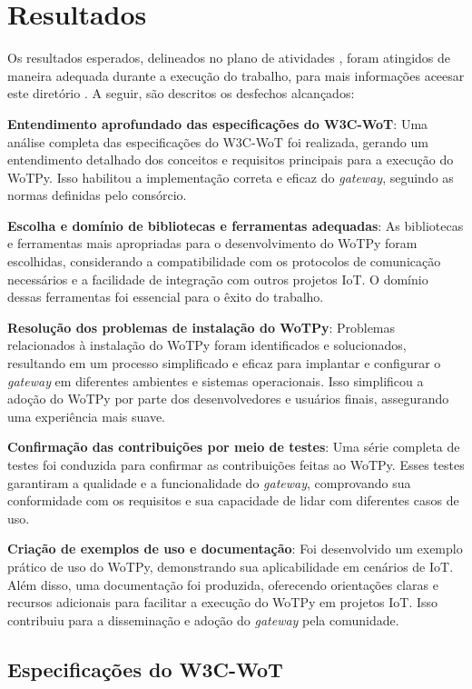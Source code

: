 \chapter{Resultados}

Os resultados esperados, delineados no plano de atividades , foram atingidos de maneira adequada durante a execução do trabalho, para mais informações aceesar este diretório \cite{gitwotpy:readme}. A seguir, são descritos os desfechos alcançados:

\textbf{Entendimento aprofundado das especificações do W3C-WoT}: Uma análise completa das especificações do W3C-WoT foi realizada, gerando um entendimento detalhado dos conceitos e requisitos principais para a execução do WoTPy. Isso habilitou a implementação correta e eficaz do \textit{gateway}, seguindo as normas definidas pelo consórcio.

\textbf{Escolha e domínio de bibliotecas e ferramentas adequadas}: As bibliotecas e ferramentas mais apropriadas para o desenvolvimento do WoTPy foram escolhidas, considerando a compatibilidade com os protocolos de comunicação necessários e a facilidade de integração com outros projetos IoT. O domínio dessas ferramentas foi essencial para o êxito do trabalho.

\textbf{Resolução dos problemas de instalação do WoTPy}: Problemas relacionados à instalação do WoTPy foram identificados e solucionados, resultando em um processo simplificado e eficaz para implantar e configurar o \textit{gateway} em diferentes ambientes e sistemas operacionais. Isso simplificou a adoção do WoTPy por parte dos desenvolvedores e usuários finais, assegurando uma experiência mais suave.

\textbf{Confirmação das contribuições por meio de testes}: Uma série completa de testes foi conduzida para confirmar as contribuições feitas ao WoTPy. Esses testes garantiram a qualidade e a funcionalidade do \textit{gateway}, comprovando sua conformidade com os requisitos e sua capacidade de lidar com diferentes casos de uso.

\textbf{Criação de exemplos de uso e documentação}: Foi desenvolvido um exemplo prático de uso do WoTPy, demonstrando sua aplicabilidade em cenários de IoT. Além disso, uma documentação foi produzida, oferecendo orientações claras e recursos adicionais para facilitar a execução do WoTPy em projetos IoT. Isso contribuiu para a disseminação e adoção do \textit{gateway} pela comunidade.

\section{Especificações do W3C-WoT}

